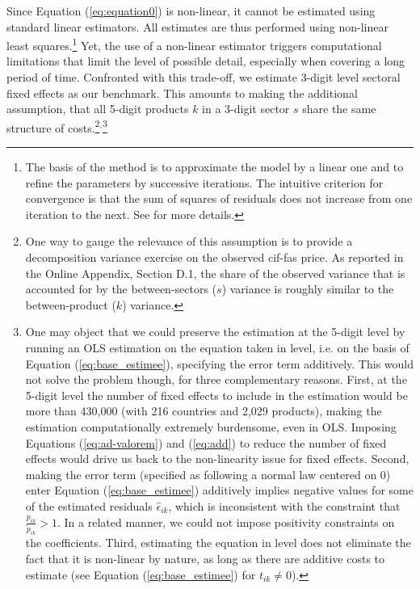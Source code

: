 \documentclass[a4paper,11pt]{article}
\begin{document}
Since Equation (\ref{eq:equation0}) is non-linear, it cannot be estimated using standard linear estimators. All estimates are thus performed using non-linear least squares.\footnote{The basis of the method is to approximate the model by a linear one and to refine the parameters by successive iterations. The intuitive criterion for convergence is that the sum of squares of residuals does not increase from one iteration to the next.
See \cite{Woolridge-Book-2001} for more details.} Yet, the use of a non-linear estimator triggers computational limitations that limit the level of possible detail, especially when covering a long period of time.
Confronted with this trade-off, we estimate 3-digit level sectoral fixed effects as our benchmark. This amounts to making the additional assumption, that all 5-digit products $k$ in a 3-digit sector $s$ share the same structure of costs.\footnote{One way to gauge the relevance of this assumption is to provide a decomposition variance exercise on the observed cif-fas price.
As reported in the Online Appendix, Section D.1, the share of the observed variance that is accounted for by the between-sectors ($s$) variance is roughly similar to the between-product ($k$) variance.}$^{,}$\footnote{One may object that we could preserve the estimation at the 5-digit level by running an OLS estimation on the equation taken in level, i.e.
on the basis of Equation (\ref{eq:base_estimee}), specifying the error term additively.
This would not solve the problem though, for three complementary reasons.
First, at the 5-digit level the number of fixed effects to include in the estimation would be more than 430,000 (with 216 countries and 2,029 products), making the estimation computationally extremely burdensome, even in OLS.
Imposing Equations (\ref{eq:ad-valorem}) and (\ref{eq:add}) to reduce the number of fixed effects would drive us back to the non-linearity issue for fixed effects.
Second, making the error term (specified as following a normal law centered on 0) enter Equation (\ref{eq:base_estimee}) additively implies negative values for some of the estimated residuals $\widehat{\epsilon}_{ik}$, which is inconsistent with the constraint that $\frac{p_{ik}}{\widetilde{p}_{ik}}>1$. In a related manner, we could not impose positivity constraints on the coefficients. Third, estimating the equation in level does not eliminate the fact that it is non-linear by nature, as long as there are additive costs to estimate (see Equation (\ref{eq:base_estimee}) for $t_{ik} \neq 0$).}
\end{document}

